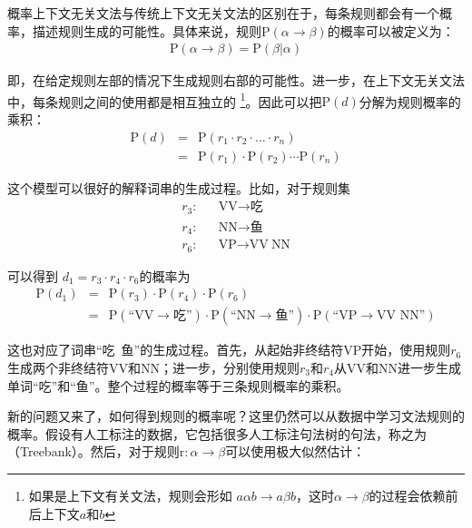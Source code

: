 \parinterval 概率上下文无关文法与传统上下文无关文法的区别在于，每条规则都会有一个概率，描述规则生成的可能性。具体来说，规则$\textrm{P}(\alpha \to \beta)$的概率可以被定义为：
\begin{eqnarray}
\textrm{P}(\alpha \to \beta)=\textrm{P}(\beta | \alpha)
\label{eq:2-45}
\end{eqnarray}

\noindent 即，在给定规则左部的情况下生成规则右部的可能性。进一步，在上下文无关文法中，每条规则之间的使用都是相互独立的 \footnote[3]{如果是上下文有关文法，规则会形如 $a\alpha b\to a\beta b$，这时$\alpha \to \beta $的过程会依赖前后上下文$a$和$b$}。因此可以把$\textrm{P}(d)$分解为规则概率的乘积：
\begin{eqnarray}
\textrm{P}(d) & = & \textrm{P}(r_1 \cdot r_2 \cdot ... \cdot r_n) \nonumber \\
& = & \textrm{P}(r_1) \cdot \textrm{P}(r_2) \cdots \textrm{P}(r_n)
\label{eq:2-46}
\end{eqnarray}

\parinterval 这个模型可以很好的解释词串的生成过程。比如，对于规则集
\begin{eqnarray}
r_3: & &\textrm{VV} \to \text{吃}\nonumber \\
r_4: & & \textrm{NN} \to \text{鱼}\nonumber \\
r_6: & & \textrm{VP} \to \textrm{VV}\ \textrm{NN} \nonumber
\label{eq:2-47}
\end{eqnarray}

\parinterval 可以得到 $d_1=r_3 \cdot r_4 \cdot r_6$的概率为
\begin{eqnarray}
\textrm{P}(d_1) & = &\textrm{P}(r_3) \cdot \textrm{P}(r_4) \cdot \textrm{P}(r_6)\nonumber  \\
& = & \textrm{P}(\textrm{``VV} \to \text{吃''}) \cdot \textrm{P}(\textrm{``NN} \to \text{鱼''}) \cdot \textrm{P}(\textrm{``VP} \to \textrm{VV NN''})
\label{eq:2-48}
\end{eqnarray}

\parinterval 这也对应了词串``吃\ 鱼''的生成过程。首先，从起始非终结符VP开始，使用规则$r_6$生成两个非终结符VV和NN；进一步，分别使用规则$r_3$和$r_4$从VV和NN进一步生成单词``吃''和``鱼''。整个过程的概率等于三条规则概率的乘积。

\parinterval 新的问题又来了，如何得到规则的概率呢？这里仍然可以从数据中学习文法规则的概率。假设有人工标注的数据，它包括很多人工标注句法树的句法，称之为{\small{}}（Treebank）。然后，对于规则$\textrm{r}:\alpha \to \beta$可以使用极大似然估计：

